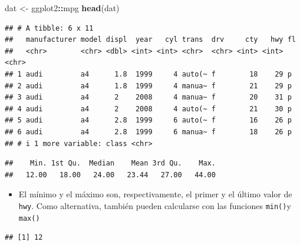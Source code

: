 \documentclass[
]{book}
\newenvironment{Shaded}{\begin{snugshade}}{\end{snugshade}}
\newcommand{\FunctionTok}[1]{\textcolor[rgb]{0.13,0.29,0.53}{\textbf{#1}}}
\newcommand{\NormalTok}[1]{#1}
\newcommand{\OtherTok}[1]{\textcolor[rgb]{0.56,0.35,0.01}{#1}}
\newcommand{\SpecialCharTok}[1]{\textcolor[rgb]{0.81,0.36,0.00}{\textbf{#1}}}
\providecommand{\tightlist}{%
  \setlength{\itemsep}{0pt}\setlength{\parskip}{0pt}}
\begin{document}
\begin{Shaded}
\begin{Highlighting}[]
\NormalTok{dat }\OtherTok{\textless{}{-}}\NormalTok{ ggplot2}\SpecialCharTok{::}\NormalTok{mpg}
\FunctionTok{head}\NormalTok{(dat)}
\end{Highlighting}
\end{Shaded}

\begin{verbatim}
## # A tibble: 6 x 11
##   manufacturer model displ  year   cyl trans  drv     cty   hwy fl   
##   <chr>        <chr> <dbl> <int> <int> <chr>  <chr> <int> <int> <chr>
## 1 audi         a4      1.8  1999     4 auto(~ f        18    29 p    
## 2 audi         a4      1.8  1999     4 manua~ f        21    29 p    
## 3 audi         a4      2    2008     4 manua~ f        20    31 p    
## 4 audi         a4      2    2008     4 auto(~ f        21    30 p    
## 5 audi         a4      2.8  1999     6 auto(~ f        16    26 p    
## 6 audi         a4      2.8  1999     6 manua~ f        18    26 p    
## # i 1 more variable: class <chr>
\end{verbatim}

\begin{Shaded}
\end{Shaded}

\begin{verbatim}
##    Min. 1st Qu.  Median    Mean 3rd Qu.    Max. 
##   12.00   18.00   24.00   23.44   27.00   44.00
\end{verbatim}

\begin{itemize}
\tightlist
\item
  El mínimo y el máximo son, respectivamente, el primer y el último valor de \texttt{hwy}. Como alternativa, también pueden calcularse con las funciones \texttt{min()}y \texttt{max()}
\end{itemize}

\begin{Shaded}
\end{Shaded}

\begin{verbatim}
## [1] 12
\end{verbatim}
\end{document}
